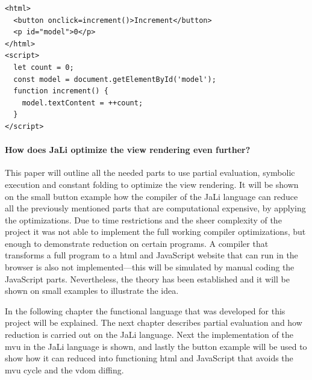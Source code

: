 \begin{lstlisting}[columns=fullflexible, label={button_increment}, language=Other, caption={Reduced example to show only the incrementing}]
<html>
  <button onclick=increment()>Increment</button>
  <p id="model">0</p>
</html>
<script>
  let count = 0;
  const model = document.getElementById('model');
  function increment() {
    model.textContent = ++count;
  }
</script>
\end{lstlisting}

\paragraph{How does JaLi optimize the view rendering even further?} This paper will outline all the needed parts to use partial evaluation, symbolic execution and constant folding to optimize the view rendering. It will be shown on the small button example how the compiler of the JaLi language can reduce all the previously mentioned parts that are computational expensive, by applying the optimizations.
Due to time restrictions and the sheer complexity of the project it was not able to implement the full working compiler optimizations, but enough to demonstrate reduction on certain programs. A compiler that transforms a full program to a \gls{html} and JavaScript website that can run in the browser is also not implemented---this will be simulated by manual coding the JavaScript parts. Nevertheless, the theory has been established and it will be shown on small examples to illustrate the idea.

In the following chapter the functional language that was developed for this project will be explained. The next chapter describes partial evaluation and how reduction is carried out on the JaLi language. Next the implementation of the \gls{mvu} in the JaLi language is shown, and lastly the button example will be used to show how it can reduced into functioning \gls{html} and JavaScript that avoids the \gls{mvu} cycle and the \gls{vdom} diffing.
